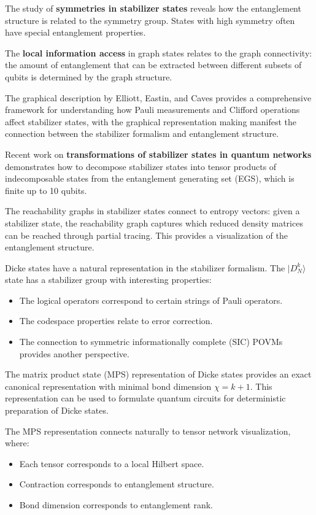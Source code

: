\documentclass[12pt,a4paper]{article}
\begin{document}
The study of \textbf{symmetries in stabilizer states} \cite{Englbrecht2020} reveals how the entanglement structure is related to the symmetry group. States with high symmetry often have special entanglement properties.

The \textbf{local information access} in graph states relates to the graph connectivity: the amount of entanglement that can be extracted between different subsets of qubits is determined by the graph structure.

The graphical description by Elliott, Eastin, and Caves provides a comprehensive framework for understanding how Pauli measurements and Clifford operations affect stabilizer states, with the graphical representation making manifest the connection between the stabilizer formalism and entanglement structure.

Recent work on \textbf{transformations of stabilizer states in quantum networks} demonstrates how to decompose stabilizer states into tensor products of indecomposable states from the entanglement generating set (EGS), which is finite up to 10 qubits.

The reachability graphs in stabilizer states connect to entropy vectors: given a stabilizer state, the reachability graph captures which reduced density matrices can be reached through partial tracing. This provides a visualization of the entanglement structure.

Dicke states have a natural representation in the stabilizer formalism. The $|D_N^k\rangle$ state has a stabilizer group with interesting properties:
\begin{itemize}
	\item The logical operators correspond to certain strings of Pauli operators.
	\item The codespace properties relate to error correction.
	\item The connection to symmetric informationally complete (SIC) POVMs provides another perspective.
\end{itemize}

The matrix product state (MPS) representation of Dicke states provides an exact canonical representation with minimal bond dimension $\chi = k+1$. This representation can be used to formulate quantum circuits for deterministic preparation of Dicke states.

The MPS representation connects naturally to tensor network visualization, where:
\begin{itemize}
	\item Each tensor corresponds to a local Hilbert space.
	\item Contraction corresponds to entanglement structure.
	\item Bond dimension corresponds to entanglement rank.
\end{itemize}
\end{document}
